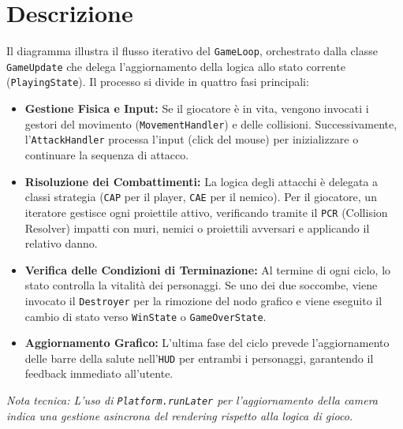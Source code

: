 \documentclass[12pt,a4paper]{article}
\begin{document}
\section*{Descrizione}
\begin{small}
Il diagramma illustra il flusso iterativo del \texttt{GameLoop}, orchestrato dalla classe \texttt{GameUpdate} che delega l'aggiornamento della logica allo stato corrente (\texttt{PlayingState}). Il processo si divide in quattro fasi principali:

\begin{itemize}[leftmargin=*, noitemsep, topsep=0pt]
    \item \textbf{Gestione Fisica e Input:} Se il giocatore è in vita, vengono invocati i gestori del movimento (\texttt{MovementHandler}) e delle collisioni. Successivamente, l'\texttt{AttackHandler} processa l'input (click del mouse) per inizializzare o continuare la sequenza di attacco.
    
    \item \textbf{Risoluzione dei Combattimenti:} La logica degli attacchi è delegata a classi strategia (\texttt{CAP} per il player, \texttt{CAE} per il nemico). Per il giocatore, un iteratore gestisce ogni proiettile attivo, verificando tramite il \texttt{PCR} (Collision Resolver) impatti con muri, nemici o proiettili avversari e applicando il relativo danno.
    
    \item \textbf{Verifica delle Condizioni di Terminazione:} Al termine di ogni ciclo, lo stato controlla la vitalità dei personaggi. Se uno dei due soccombe, viene invocato il \texttt{Destroyer} per la rimozione del nodo grafico e viene eseguito il cambio di stato verso \texttt{WinState} o \texttt{GameOverState}.
    
    \item \textbf{Aggiornamento Grafico:} L'ultima fase del ciclo prevede l'aggiornamento delle barre della salute nell'\texttt{HUD} per entrambi i personaggi, garantendo il feedback immediato all'utente.
\end{itemize}

\noindent \textit{Nota tecnica: L'uso di \texttt{Platform.runLater} per l'aggiornamento della camera indica una gestione asincrona del rendering rispetto alla logica di gioco.}
\end{small}
\end{document}
